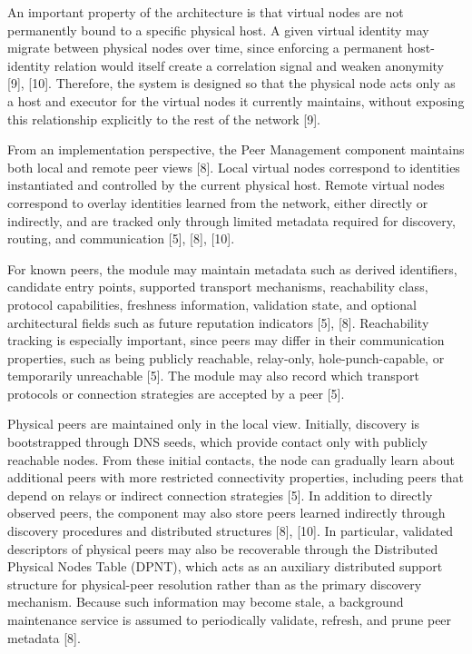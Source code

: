 \documentclass[12pt,a4paper]{article}
\begin{document}
An important property of the architecture is that virtual nodes are not permanently bound to a specific physical host. A given virtual identity may migrate between physical nodes over time, since enforcing a permanent host-identity relation would itself create a correlation signal and weaken anonymity [9], [10]. Therefore, the system is designed so that the physical node acts only as a host and executor for the virtual nodes it currently maintains, without exposing this relationship explicitly to the rest of the network [9].

From an implementation perspective, the Peer Management component maintains both local and remote peer views [8]. Local virtual nodes correspond to identities instantiated and controlled by the current physical host. Remote virtual nodes correspond to overlay identities learned from the network, either directly or indirectly, and are tracked only through limited metadata required for discovery, routing, and communication [5], [8], [10].

For known peers, the module may maintain metadata such as derived identifiers, candidate entry points, supported transport mechanisms, reachability class, protocol capabilities, freshness information, validation state, and optional architectural fields such as future reputation indicators [5], [8]. Reachability tracking is especially important, since peers may differ in their communication properties, such as being publicly reachable, relay-only, hole-punch-capable, or temporarily unreachable [5]. The module may also record which transport protocols or connection strategies are accepted by a peer [5].

Physical peers are maintained only in the local view. Initially, discovery is bootstrapped
through DNS seeds, which provide contact only with publicly reachable nodes. From
these initial contacts, the node can gradually learn about additional peers with more
restricted connectivity properties, including peers that depend on relays or indirect
connection strategies [5]. In addition to directly observed peers, the component may also
store peers learned indirectly through discovery procedures and distributed structures
[8], [10]. In particular, validated descriptors of physical peers may also be recoverable
through the Distributed Physical Nodes Table (DPNT), which acts as an auxiliary
distributed support structure for physical-peer resolution rather than as the primary
discovery mechanism. Because such information may become stale, a background
maintenance service is assumed to periodically validate, refresh, and prune peer
metadata [8].
\end{document}

